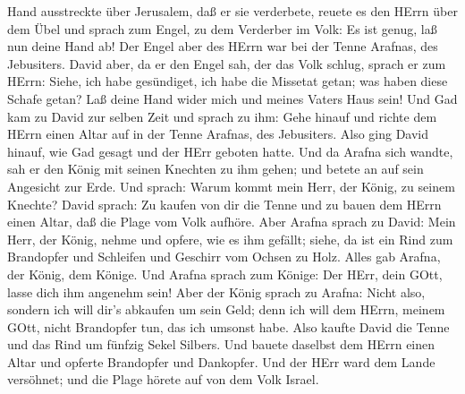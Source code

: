 Hand ausstreckte über Jerusalem, daß er sie verderbete, reuete es den
HErrn über dem Übel und sprach zum Engel, zu dem Verderber im Volk: Es
ist genug, laß nun deine Hand ab! Der Engel aber des HErrn war bei der
Tenne Arafnas, des Jebusiters.  David aber, da er den Engel
sah, der das Volk schlug, sprach er zum HErrn: Siehe, ich habe
gesündiget, ich habe die Missetat getan; was haben diese Schafe getan?
Laß deine Hand wider mich und meines Vaters Haus sein!  Und
Gad kam zu David zur selben Zeit und sprach zu ihm: Gehe hinauf und
richte dem HErrn einen Altar auf in der Tenne Arafnas, des Jebusiters.
 Also ging David hinauf, wie Gad gesagt und der HErr
geboten hatte.  Und da Arafna sich wandte, sah er den König
mit seinen Knechten zu ihm gehen; und betete an auf sein Angesicht zur
Erde.  Und sprach: Warum kommt mein Herr, der König, zu
seinem Knechte? David sprach: Zu kaufen von dir die Tenne und zu bauen
dem HErrn einen Altar, daß die Plage vom Volk aufhöre. 
Aber Arafna sprach zu David: Mein Herr, der König, nehme und opfere, wie
es ihm gefällt; siehe, da ist ein Rind zum Brandopfer und Schleifen und
Geschirr vom Ochsen zu Holz.  Alles gab Arafna, der König,
dem Könige. Und Arafna sprach zum Könige: Der HErr, dein GOtt, lasse
dich ihm angenehm sein!  Aber der König sprach zu Arafna:
Nicht also, sondern ich will dir's abkaufen um sein Geld; denn ich will
dem HErrn, meinem GOtt, nicht Brandopfer tun, das ich umsonst habe. Also
kaufte David die Tenne und das Rind um fünfzig Sekel Silbers.
 Und bauete daselbst dem HErrn einen Altar und opferte
Brandopfer und Dankopfer. Und der HErr ward dem Lande versöhnet; und die
Plage hörete auf von dem Volk Israel.
